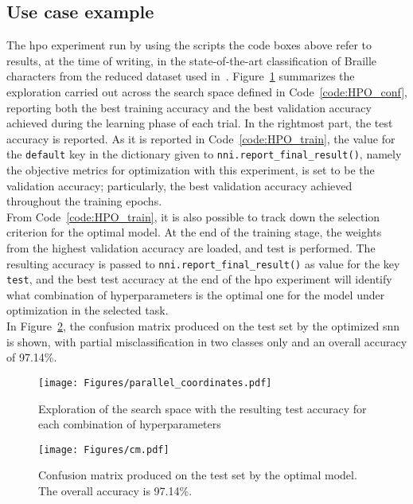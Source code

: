 

\subsection{Use case example}

The \gls{hpo} experiment run by using the scripts the code boxes above refer to results, at the time of writing, in the state-of-the-art classification of Braille characters from the reduced dataset used in~\cite{pedersen_neuromorphic_2024}. Figure~\ref{fig:par_coord} summarizes the exploration carried out across the search space defined in Code~\ref{code:HPO_conf}, reporting both the best training accuracy and the best validation accuracy achieved during the learning phase of each trial.
In the rightmost part, the test accuracy is reported.
As it is reported in Code~\ref{code:HPO_train}, the value for the \texttt{default} key in the dictionary given to \texttt{nni.report\_final\_result()}, namely the objective metrics for optimization with this experiment, is set to be the validation accuracy; particularly, the best validation accuracy achieved throughout the training epochs.\\
From Code~\ref{code:HPO_train}, it is also possible to track down the selection criterion for the optimal model.
At the end of the training stage, the weights from the highest validation accuracy are loaded, and test is performed.
The resulting accuracy is passed to \texttt{nni.report\_final\_result()} as value for the key \texttt{test}, and the best test accuracy at the end of the \gls{hpo} experiment will identify what combination of hyperparameters is the optimal one for the model under optimization in the selected task.\\
In Figure~\ref{fig:cm}, the confusion matrix produced on the test set by the optimized \gls{snn} is shown, with partial misclassification in two classes only and an overall accuracy of 97.14\%.

\begin{figure}[b]
    \centering
    \texttt{[image: Figures/parallel\_coordinates.pdf]}
    \caption{Exploration of the search space with the resulting test accuracy for each combination of hyperparameters}
    \label{fig:par_coord}
\end{figure}

\begin{figure}[t]
    \centering
    \texttt{[image: Figures/cm.pdf]}
    \caption{Confusion matrix produced on the test set by the optimal model. The overall accuracy is 97.14\%.}
    \label{fig:cm}
\end{figure}


